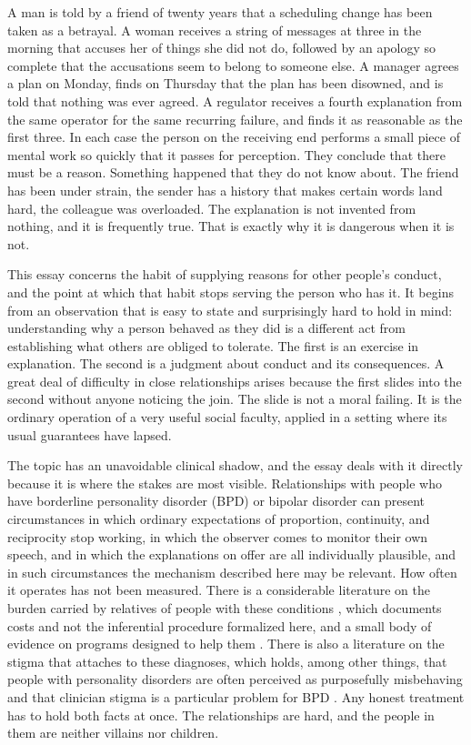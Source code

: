 \documentclass[11pt]{article}
\theoremstyle{definition}
\theoremstyle{remark}
\begin{document}
A man is told by a friend of twenty years that a scheduling change has been taken as a betrayal. A woman receives a string of messages at three in the morning that accuses her of things she did not do, followed by an apology so complete that the accusations seem to belong to someone else. A manager agrees a plan on Monday, finds on Thursday that the plan has been disowned, and is told that nothing was ever agreed. A regulator receives a fourth explanation from the same operator for the same recurring failure, and finds it as reasonable as the first three. In each case the person on the receiving end performs a small piece of mental work so quickly that it passes for perception. They conclude that there must be a reason. Something happened that they do not know about. The friend has been under strain, the sender has a history that makes certain words land hard, the colleague was overloaded. The explanation is not invented from nothing, and it is frequently true. That is exactly why it is dangerous when it is not.

This essay concerns the habit of supplying reasons for other people's conduct, and the point at which that habit stops serving the person who has it. It begins from an observation that is easy to state and surprisingly hard to hold in mind: understanding why a person behaved as they did is a different act from establishing what others are obliged to tolerate. The first is an exercise in explanation. The second is a judgment about conduct and its consequences. A great deal of difficulty in close relationships arises because the first slides into the second without anyone noticing the join. The slide is not a moral failing. It is the ordinary operation of a very useful social faculty, applied in a setting where its usual guarantees have lapsed.

The topic has an unavoidable clinical shadow, and the essay deals with it directly because it is where the stakes are most visible. Relationships with people who have borderline personality disorder (BPD) or bipolar disorder can present circumstances in which ordinary expectations of proportion, continuity, and reciprocity stop working, in which the observer comes to monitor their own speech, and in which the explanations on offer are all individually plausible, and in such circumstances the mechanism described here may be relevant. How often it operates has not been measured. There is a considerable literature on the burden carried by relatives of people with these conditions \citep{bailey2013}, which documents costs and not the inferential procedure formalized here, and a small body of evidence on programs designed to help them \citep{hoffman2005,miklowitz2003}. There is also a literature on the stigma that attaches to these diagnoses, which holds, among other things, that people with personality disorders are often perceived as purposefully misbehaving and that clinician stigma is a particular problem for BPD \citep{sheehan2016}. Any honest treatment has to hold both facts at once. The relationships are hard, and the people in them are neither villains nor children.
\end{document}
